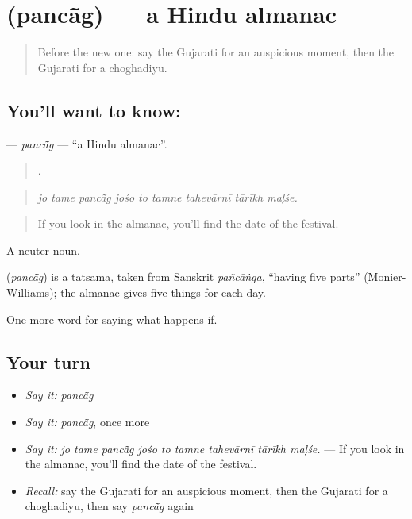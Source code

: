 \section[\texorpdfstring{\gu{પંચાંગ} (pancā̃g)}{પંચાંગ (pancā̃g)}]{ (pancā̃g) — a Hindu almanac}

\label{lesson:GU-C536-pancag}



\begin{quote}
Before the new one: say the Gujarati for an auspicious moment, then the Gujarati for a choghadiyu.
\end{quote}

\subsection*{You'll want to know: }
\textbf{} — \emph{pancā̃g} — \textquotedblleft{}a Hindu almanac\textquotedblright{}.

\begin{quote}
        .
\end{quote}

\begin{quote}
\emph{jo tame pancā̃g jośo to tamne tahevārnī tārīkh maḷśe.}
\end{quote}

\begin{quote}
If you look in the almanac, you'll find the date of the festival.
\end{quote}

A neuter noun.

\begin{cousinweb}
\textbf{} (\emph{pancā̃g}) is a tatsama, taken from Sanskrit \emph{pañcāṅga}, \textquotedblleft{}having five parts\textquotedblright{} (Monier-Williams); the almanac gives five things for each day.
\end{cousinweb}

\begin{grammarlens}[title={What you've built}]
One more word for saying what happens if.
\end{grammarlens}

\subsection*{Your turn}
\begin{itemize}
\raggedright
  \item \emph{Say it:} \emph{pancā̃g}
  \item \emph{Say it:} \emph{pancā̃g}, once more
  \item \emph{Say it:} \emph{jo tame pancā̃g jośo to tamne tahevārnī tārīkh maḷśe.} — If you look in the almanac, you'll find the date of the festival.
  \item \emph{Recall:} say the Gujarati for an auspicious moment, then the Gujarati for a choghadiyu, then say \emph{pancā̃g} again
\end{itemize}


